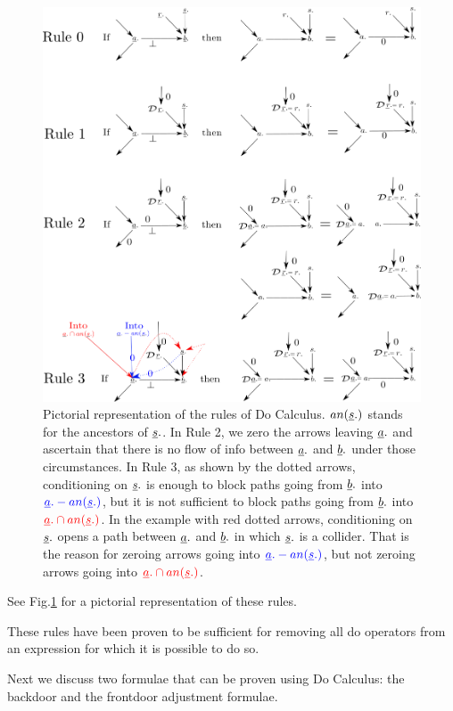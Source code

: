 \begin{figure}[h!]
\centering
\includegraphics[width=5in]
{do-calc/do-rules.png}
\caption{Pictorial representation of the
 rules of Do Calculus. $an({\underline{s}}.)$
stands for the ancestors 
of ${\underline{s}}.$.
In Rule 2, we zero the arrows
leaving ${\underline{a}}.$
and ascertain that 
there is no flow of info 
between ${\underline{a}}.$ and ${\underline{b}}.$
under those circumstances.
In Rule 3, 
as shown by
the dotted arrows, conditioning
on ${\underline{s}}.$
is enough to block 
paths going from ${\underline{b}}.$
into
$\color{blue}{\underline{a}}.-an({\underline{s}}.)$,
but it is not sufficient to block 
paths going from ${\underline{b}}.$
into
$\color{red}{\underline{a}}.\cap an({\underline{s}}.)$.
In the example with red dotted
arrows,
conditioning
on ${\underline{s}}.$
opens a path
between ${\underline{a}}.$ and ${\underline{b}}.$
in which ${\underline{s}}.$
is a collider.
That is the reason for 
zeroing arrows going into 
$\color{blue}{\underline{a}}.-an({\underline{s}}.)$,
but not zeroing arrows 
going into
$\color{red}{\underline{a}}.\cap an({\underline{s}}.)$.
} 
\label{fig-do-rules}
\end{figure}

See Fig.\ref{fig-do-rules}
for a pictorial representation of these
 rules.

These rules have been
proven to be 
sufficient
for removing
all do operators
from an expression
for 
which it 
is possible to do so.

Next we discuss
two formulae that can be
proven using
Do Calculus:
the backdoor and the
frontdoor
adjustment formulae.

